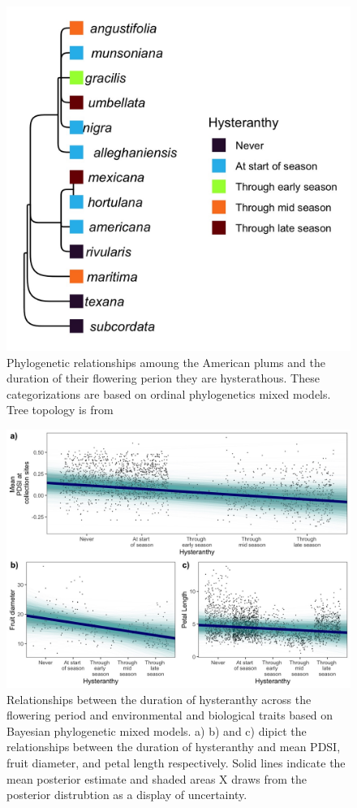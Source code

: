 \documentclass{article}[11pt]
\begin{document}
\begin{figure}[h!]
    \centering
 \includegraphics[width=.6\textwidth]{..//..//Plots/phylosig2.jpeg}
    \caption{Phylogenetic relationships amoung the American plums and the duration of their flowering perion they are hysterathous. These categorizations are based on ordinal phylogenetics mixed models. Tree topology is from \citet{Shaw:2004aa}}
    \label{fig:phylo2}
\end{figure}


\begin{figure}[h!]
    \centering
 \includegraphics[width=\textwidth]{..//..//Plots/dataplots.jpeg}
    \caption{Relationships between the duration of hysteranthy across the flowering period and environmental and biological traits based on Bayesian phylogenetic mixed models. a) b) and c) dipict the relationships between the duration of hysteranthy and mean PDSI, fruit diameter, and petal length respectively. Solid lines indicate the mean posterior estimate and shaded areas X draws from the posterior distrubtion as a display of uncertainty. }
    \label{fig:prunes}
\end{figure}
\end{document}
